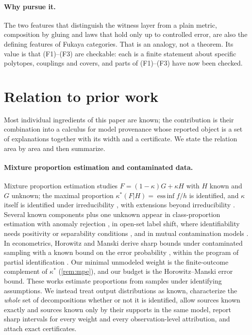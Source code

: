\documentclass[11pt]{article}
\theoremstyle{definition}
\theoremstyle{remark}
\begin{document}
\paragraph{Why pursue it.} The two features that distinguish the witness layer from a plain metric,
composition by gluing and laws that hold only up to controlled error, are also the defining features of
Fukaya categories. That is an analogy, not a theorem. Its value is that (F1)--(F3) are checkable: each is
a finite statement about specific polytopes, couplings and covers, and parts of (F1)--(F3) have now been checked.

\section{Relation to prior work}\label{sec:related}

Most individual ingredients of this paper are known; the contribution is their combination into a
calculus for model provenance whose reported object is a set of explanations together with its width
and a certificate. We state the relation area by area and then summarize.

\paragraph{Mixture proportion estimation and contaminated data.} Mixture proportion estimation studies
$F=(1-\kappa)G+\kappa H$ with $H$ known and $G$ unknown; the maximal proportion
$\kappa^*(F|H)=\operatorname{ess\,inf}f/h$ is identified, and $\kappa$ itself is identified under
irreducibility \cite{Blanchard2010,Scott2015}, with extensions beyond irreducibility \cite{Zhu2023}.
Several known components plus one unknown appear in class-proportion estimation with anomaly rejection
\cite{SandersonScott2014}, in open-set label shift, where identifiability needs positivity or
separability conditions \cite{Garg2022}, and in mutual contamination models \cite{BlanchardScott2014}.
In econometrics, Horowitz and Manski derive sharp bounds under contaminated sampling with a known
bound on the error probability \cite{HorowitzManski1995}, within the program of partial
identification \cite{Manski2003}. Our minimal unmodeled weight is the finite-outcome complement of
$\kappa^*$ (\cref{rem:mpe}), and our budget is the Horowitz--Manski error bound. These works estimate
proportions from samples under identifying assumptions. We instead treat output distributions as
known, characterize the \emph{whole} set of decompositions whether or not it is identified, allow
sources known exactly and sources known only by their supports in the same model, report sharp
intervals for every weight and every observation-level attribution, and attach exact certificates.
\end{document}
